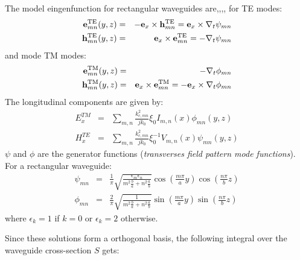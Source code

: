 The model eingenfunction for rectangular waveguides are\cite[§2.2]{marcuvitz1951},\cite[§8.1,§8.2]{Harrington2001},\cite[§5.4]{Collin1990},\cite[§3.3]{pozar2012},\cite[Appendix A]{Bers1981} for TE modes:
\begin{eqnarray}
\mathbf{e}_{mn}^{{\mathrm{TE}}}(y,z) & = & -{\mathbf e}_x \times \mathbf{h}_{mn}^{{\mathrm{TE}}} = {\mathbf e}_x \times \nabla_{t} \psi_{mn}\\
\mathbf{h}_{mn}^{{\mathrm{TE}}}(y,z) & = &  {\mathbf e}_x \times \mathbf{e}_{mn}^{{\mathrm{TE}}} = -\nabla_{t} \psi_{mn}
\end{eqnarray}
and mode TM modes:
\begin{eqnarray}
\mathbf{e}_{mn}^{{\mathrm{TM}}}(y,z) & = & -\nabla_{t}\phi_{mn}\\
\mathbf{h}_{mn}^{{\mathrm{TM}}}(y,z) & = & {\mathbf e}_x \times\mathbf{e}_{mn}^{{\mathrm{TM}}}= -{\mathbf e}_x \times\nabla_{t}\phi_{mn}
\end{eqnarray}
The longitudinal components are given by:
\begin{eqnarray}
E_{x}^{TM} & = & \sum_{m,n}\frac{k_{c,mn}^{2}}{j k_{0}}\xi_0 I_{m,n}(x)\phi_{mn}(y,z)\\
H_{x}^{TE} & = & \sum_{m,n}\frac{k_{c,mn}^{2}}{j k_{0}}\xi_0^{-1} V_{m,n}(x)\psi_{mn}(y,z)
\end{eqnarray}
$\psi$ and $\phi$ are the generator functions (\emph{transverses field pattern mode functions}). For a rectangular waveguide\cite[Table 8.1]{Harrington2001}\cite[§1.2 (6.c),§2.2]{marcuvitz1951}\cite[Appendix A, A13-14]{Bers1981}:
\begin{eqnarray}
\psi_{mn} & = & \frac{1}{\pi}\sqrt{\frac{\epsilon_{m}\epsilon_{n}}{m^{2}\frac{b}{a}+n^{2}\frac{a}{b}}}\cos\left(\frac{m\pi}{a}y\right)\cos\left(\frac{n\pi}{b}z\right)\label{eq:fonction_generatrice_TE}\\
\phi_{mn} & = & \frac{2}{\pi}\sqrt{\frac{1}{m^{2}\frac{b}{a}+n^{2}\frac{a}{b}}}\sin\left(\frac{m\pi}{a}y\right)\sin\left(\frac{n\pi}{b}z\right)\label{eq:fonction_generatrice_TM}
\end{eqnarray}
where $\epsilon_{k}=1$ if $k=0$ or $\epsilon_{k}=2$ otherwise.

Since these solutions form a orthogonal basis, the following integral over the waveguide cross-section $S$ gets\cite{marcuvitz1951,Collin1990}:


